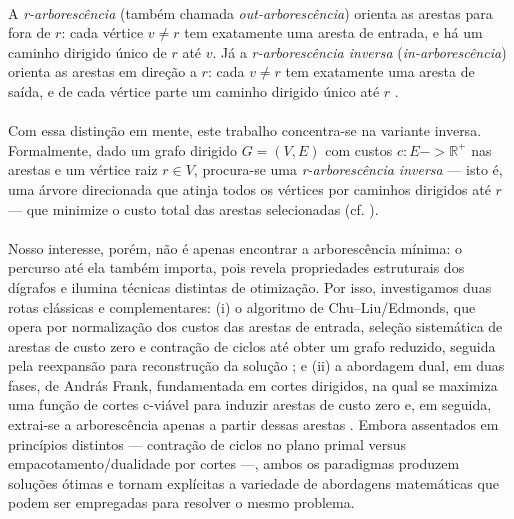 \documentclass[12pt,a4paper]{article}
\def\to{->}%
\begin{document}
\paragraph{}
A \textit{r-arborescência} (também chamada \textit{out-arborescência}) orienta as arestas para fora de \(r\): cada vértice \(v\neq r\) tem exatamente uma aresta de entrada, e há um caminho dirigido único de \(r\) até \(v\). Já a \textit{r-arborescência inversa} (\textit{in-arborescência}) orienta as arestas em direção a \(r\): cada \(v\neq r\) tem exatamente uma aresta de saída, e de cada vértice parte um caminho dirigido único até \(r\) \cite{edmonds1967optimum,frank2014}.

\paragraph{}
Com essa distinção em mente, este trabalho concentra-se na variante inversa. Formalmente, dado um grafo dirigido \(G=(V,E)\) com custos \(c:E\to\mathbb{R}^+\) nas arestas e um vértice raiz \(r\in V\), procura-se uma \textit{r-arborescência inversa} — isto é, uma árvore direcionada que atinja todos os vértices por caminhos dirigidos até \(r\) — que minimize o custo total das arestas selecionadas (cf. \cite{edmonds1967optimum,frank2014}).

\paragraph{}
Nosso interesse, porém, não é apenas encontrar a arborescência mínima: o percurso até ela também importa, pois revela propriedades estruturais dos dígrafos e ilumina técnicas distintas de otimização. Por isso, investigamos duas rotas clássicas e complementares: (i) o algoritmo de Chu--Liu/Edmonds, que opera por normalização dos custos das arestas de entrada, seleção sistemática de arestas de custo zero e contração de ciclos até obter um grafo reduzido, seguida pela reexpansão para reconstrução da solução \cite{chu1965,edmonds1967optimum}; e (ii) a abordagem dual, em duas fases, de András Frank, fundamentada em cortes dirigidos, na qual se maximiza uma função de cortes c-viável para induzir arestas de custo zero e, em seguida, extrai-se a arborescência apenas a partir dessas arestas \cite{frank2014}. Embora assentados em princípios distintos — contração de ciclos no plano primal versus empacotamento/dualidade por cortes —, ambos os paradigmas produzem soluções ótimas e tornam explícitas a variedade de abordagens matemáticas que podem ser empregadas para resolver o mesmo problema.
\end{document}
